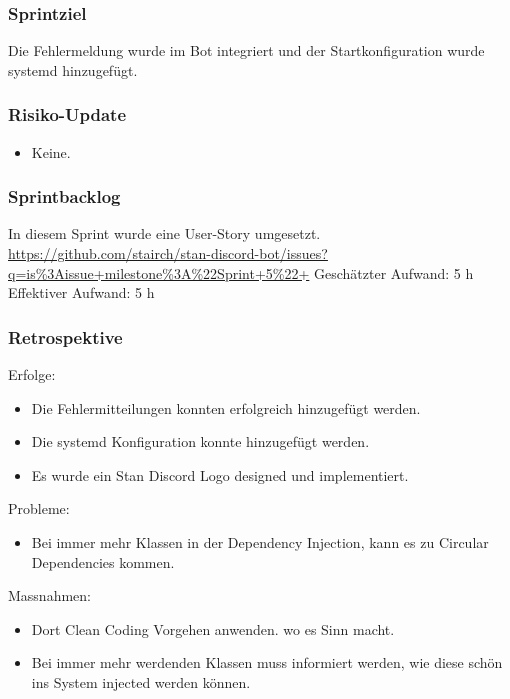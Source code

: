 \documentclass[a4paper, table]{article}
\begin{document}
\subsubsection*{Sprintziel}
Die Fehlermeldung wurde im Bot integriert und der Startkonfiguration wurde systemd hinzugefügt.

\subsubsection*{Risiko-Update}
\begin{itemize}
    \item Keine.
\end{itemize}

\subsubsection*{Sprintbacklog}
In diesem Sprint wurde eine User-Story umgesetzt.\\
\url{https://github.com/stairch/stan-discord-bot/issues?q=is%3Aissue+milestone%3A%22Sprint+5%22+}
\newline
Geschätzter Aufwand: 5 h
\newline
Effektiver Aufwand: 5 h

\subsubsection*{Retrospektive}
Erfolge:
\begin{itemize}
    \item Die Fehlermitteilungen konnten erfolgreich hinzugefügt werden.
    \item Die systemd Konfiguration konnte hinzugefügt werden.
    \item Es wurde ein Stan Discord Logo designed und implementiert.
\end{itemize}
Probleme:
\begin{itemize}
    \item Bei immer mehr Klassen in der Dependency Injection, kann es zu Circular Dependencies kommen.
\end{itemize}
Massnahmen:
\begin{itemize}
    \item Dort Clean Coding Vorgehen anwenden. wo es Sinn macht.
    \item Bei immer mehr werdenden Klassen muss informiert werden, wie diese schön ins System injected werden können.
\end{itemize}
\end{document}
